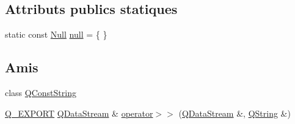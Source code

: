 \subsection*{Attributs publics statiques}
\begin{DoxyCompactItemize}
\item 
static const \hyperlink{struct_q_string_1_1_null}{Null} \hyperlink{class_q_string_ad5c6b3d92cd7034d555365fd39bfdf4b}{null} = \{ \}
\end{DoxyCompactItemize}
\subsection*{Amis}
\begin{DoxyCompactItemize}
\item 
class \hyperlink{class_q_string_aff7e2646af69210685c894cbc1646332}{Q\+Const\+String}
\item 
\hyperlink{qglobal_8h_a7323ea4c33b4021dee51e9b1f773538d}{Q\+\_\+\+E\+X\+P\+O\+R\+T} \hyperlink{class_q_data_stream}{Q\+Data\+Stream} \& \hyperlink{class_q_string_ae8d642385fbe1a96358fe7432baf546b}{operator$>$$>$} (\hyperlink{class_q_data_stream}{Q\+Data\+Stream} \&, \hyperlink{class_q_string}{Q\+String} \&)
\end{DoxyCompactItemize}
